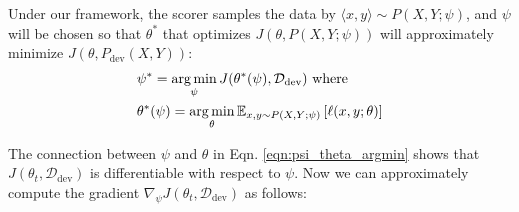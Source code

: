 Under our framework, the scorer samples the data by $\langle x, y \rangle \sim P(X, Y; \psi)$, and $\psi$ will be chosen so that $\theta^*$ that optimizes $J(\theta, P(X, Y;\psi))$ will approximately minimize $J(\theta, P_\text{dev}(X,Y))$: 
\begin{equation}
  \label{eqn:psi_theta_argmin}
  \begin{aligned}
   & \psi^* = \operatorname*{arg\,min}_\psi
  J(\theta^*(\psi), \mathcal{D}_\text{dev}) 
    ~\text{where}~ \\
   & \theta^*(\psi) = \operatorname*{arg\,min}_\theta \mathbb{E}_{x, y \sim P(X, Y; \psi)} \left[ \ell(x, y; \theta) \right]
  \end{aligned}
\end{equation}

The connection between $\psi$ and $\theta$ in Eqn. \ref{eqn:psi_theta_argmin} shows that $J(\theta_t, \mathcal{D}_\text{dev})$ is differentiable with respect to $\psi$. Now we can approximately compute the gradient $\nabla_\psi J(\theta_t, \mathcal{D}_\text{dev})$ as follows:

